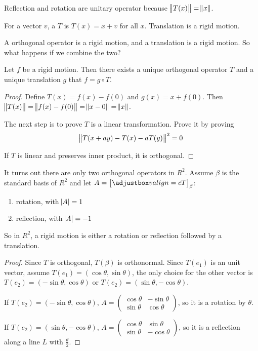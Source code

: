 Reflection and rotation are unitary operator because $\norm{T(x)} = \norm{x}$.

\begin{definition}[Translation]
    For a vector $v$, a  $T$ is $T(x) = x + v$ for all $x$. Translation is a rigid motion.
\end{definition}

A orthogonal operator is a rigid motion, and a translation is a rigid motion. So what happens if we combine the two?

\begin{theorem}
    Let $f$ be a rigid motion. Then there exists a unique orthogonal operator $T$ and a unique translation $g$ that $f = g  \circ T$.
\end{theorem}
\begin{proof}
    Define $T(x) = f(x) - f(0)$ and $g(x) = x + f(0)$. Then $\norm{T(x)} = \norm{f(x) - f(0)} = \norm{x - 0} = \norm{x}$.
    
    The next step is to prove $T$ is a linear transformation. Prove it by proving 
    \begin{equation*}
        \norm{T(x + a y) - T(x) - aT(y)}^2 = 0
    \end{equation*}
    
    If $T$ is linear and preserves inner product, it is orthogonal.
\end{proof}

\begin{theorem}
    It turns out there are only two orthogonal operators in $R^2$. Assume $\beta$ is the standard basis of $R^2$ and let $A = \coordinate{T}_\beta$:
\begin{enumerate}
    \item rotation, with $\abs{A} = 1$
    \item reflection, with $\abs{A} = -1$
\end{enumerate}

So in $R^2$, a rigid motion is either a rotation or reflection followed by a translation.
\end{theorem}
\begin{proof}
    Since $T$ is orthogonal, $T(\beta)$ is orthonormal. Since $T(e_1)$ is an unit vector, assume $T(e_1) = (\cos \theta, \sin \theta)$, the only choice for the other vector is $T(e_2) = (- \sin \theta, \cos \theta)$ or $T(e_2) = (\sin \theta, - \cos \theta)$.
    
    If $T(e_2) = (- \sin \theta, \cos \theta)$, $A = \begin{pmatrix}
                \cos \theta & - \sin \theta \\
        \sin \theta & \cos \theta
    \end{pmatrix}$, so it is a rotation by $\theta$.
    
    If $T(e_2) = (\sin \theta, - \cos \theta)$, $A = \begin{pmatrix}
        \cos \theta & \sin \theta \\
        \sin \theta & -\cos \theta
    \end{pmatrix}$, so it is a reflection along a line $L$ with $\displaystyle \frac{\theta}{2}$.
\end{proof}


